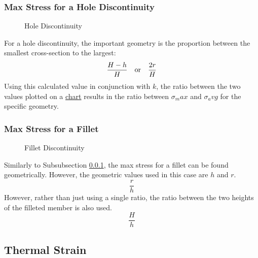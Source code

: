\documentclass[12pt]{article}
\begin{document}
\subsubsection{Max Stress for a Hole Discontinuity}
\label{sssec:maxStressForAHoleDiscontinuity}

\begin{wrapfigure}[]{r}{0.45\textwidth}
  \vspace{-50pt}
  \centering
  
  \caption{Hole Discontinuity}
  \label{fig:025_b}
\end{wrapfigure}

For a hole discontinuity, the important geometry is the proportion between the smallest cross-section to the largest:
\begin{equation*}
  \frac{H-h}{H}\ \ \ \textup{or}\ \ \ \frac{2r}{H}
\end{equation*}
Using this calculated value in conjunction with $k$, the ratio between the two values plotted on a \href{https://research.iaun.ac.ir/pd/jjfesharaki/pdfs/uploadfile_9038.pdf}{chart} results in the ratio between $\sigma_max$ and $\sigma_avg$ for the specific geometry.

\subsubsection{Max Stress for a Fillet}
\label{sssec:maxStressForAFillet}

\begin{wrapfigure}[11]{r}{0.45\textwidth}
  \vspace{-75pt}
  \centering
  
  \caption{Fillet Discontinuity}
  \label{fig:054_b}
\end{wrapfigure}

Similarly to Subsubsection \ref{sssec:maxStressForAHoleDiscontinuity}, the max stress for a fillet can be found geometrically. However, the geometric values used in this case are $h$ and $r$. 
\begin{equation*}
  \frac{r}{h}
\end{equation*}
However, rather than just using a single ratio, the ratio between the two heights of the filleted member is also used.
\begin{equation*}
  \frac{H}{h}
\end{equation*}

\subsection{Thermal Strain}
\label{ssec:thermalStrain}
\end{document}
